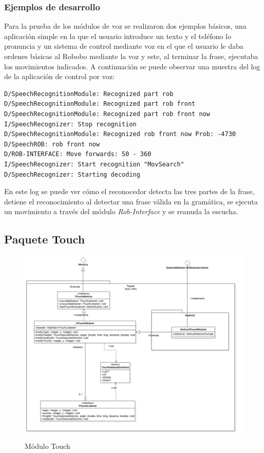 \subsubsection*{Ejemplos de desarrollo}

Para la prueba de los módulos de voz se realizaron dos ejemplos básicos, una aplicación simple en la que el usuario introduce un texto y el teléfono lo pronuncia y un sistema de control mediante voz en el que el usuario le daba ordenes básicas al Robobo mediante la voz y este, al terminar la frase, ejecutaba los movimientos indicados.
A continuación se puede observar una muestra del log de la aplicación de control por voz:

\begin{verbatim}
D/SpeechRecognitionModule: Recognized part rob
D/SpeechRecognitionModule: Recognized part rob front
D/SpeechRecognitionModule: Recognized part rob front now
I/SpeechRecognizer: Stop recognition
D/SpeechRecognitionModule: Recognized rob front now Prob: -4730
D/SpeechROB: rob front now
D/ROB-INTERFACE: Move forwards: 50 - 360
I/SpeechRecognizer: Start recognition "MovSearch"
D/SpeechRecognizer: Starting decoding
\end{verbatim}

En este log se puede ver cómo el reconocedor detecta las tres partes de la frase, detiene el reconocimiento al detectar una frase válida en la gramática, se ejecuta un movimiento a través del módulo \textit{Rob-Interface} y se reanuda la escucha.
\newpage
\subsection{Paquete Touch}


\begin{figure}
	\centering
	\includegraphics[width=1\linewidth]{imagenes/diagramas/TouchModule.png}
	\caption{Módulo Touch}
	\label{fig:touch-module}
\end{figure}


